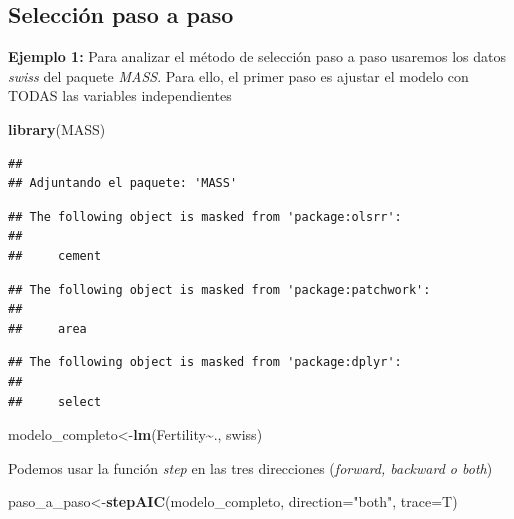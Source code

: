 \documentclass[
]{book}
\newenvironment{Shaded}{\begin{snugshade}}{\end{snugshade}}
\newcommand{\AttributeTok}[1]{\textcolor[rgb]{0.13,0.29,0.53}{#1}}
\newcommand{\FunctionTok}[1]{\textcolor[rgb]{0.13,0.29,0.53}{\textbf{#1}}}
\newcommand{\NormalTok}[1]{#1}
\newcommand{\OtherTok}[1]{\textcolor[rgb]{0.56,0.35,0.01}{#1}}
\newcommand{\SpecialCharTok}[1]{\textcolor[rgb]{0.81,0.36,0.00}{\textbf{#1}}}
\newcommand{\StringTok}[1]{\textcolor[rgb]{0.31,0.60,0.02}{#1}}
\begin{document}
\subsection{Selección paso a paso}\label{selecciuxf3n-paso-a-paso-1}

\textbf{Ejemplo 1:} Para analizar el método de selección paso a paso usaremos los datos \emph{swiss} del paquete \emph{MASS}. Para ello, el primer paso es ajustar el modelo con TODAS las variables independientes

\begin{Shaded}
\begin{Highlighting}[]
\FunctionTok{library}\NormalTok{(MASS)}
\end{Highlighting}
\end{Shaded}

\begin{verbatim}
## 
## Adjuntando el paquete: 'MASS'
\end{verbatim}

\begin{verbatim}
## The following object is masked from 'package:olsrr':
## 
##     cement
\end{verbatim}

\begin{verbatim}
## The following object is masked from 'package:patchwork':
## 
##     area
\end{verbatim}

\begin{verbatim}
## The following object is masked from 'package:dplyr':
## 
##     select
\end{verbatim}

\begin{Shaded}
\begin{Highlighting}[]
\NormalTok{modelo\_completo}\OtherTok{\textless{}{-}}\FunctionTok{lm}\NormalTok{(Fertility}\SpecialCharTok{\textasciitilde{}}\NormalTok{., swiss)}
\end{Highlighting}
\end{Shaded}

Podemos usar la función \emph{step} en las tres direcciones (\emph{forward, backward o both})

\begin{Shaded}
\begin{Highlighting}[]
\NormalTok{paso\_a\_paso}\OtherTok{\textless{}{-}}\FunctionTok{stepAIC}\NormalTok{(modelo\_completo, }\AttributeTok{direction=}\StringTok{"both"}\NormalTok{, }\AttributeTok{trace=}\NormalTok{T)}
\end{Highlighting}
\end{Shaded}
\end{document}
